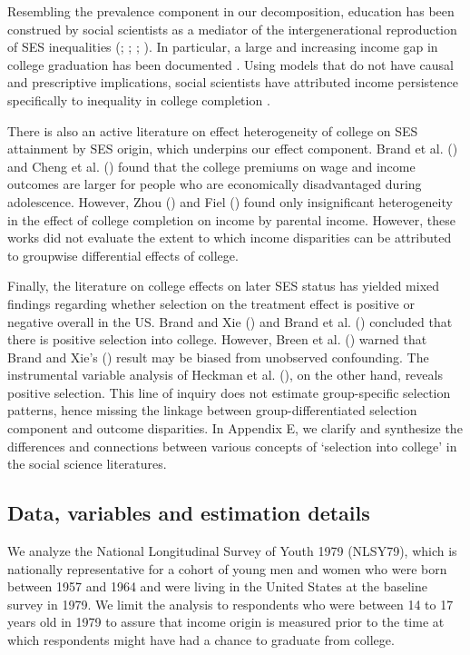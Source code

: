 \documentclass[12pt,a4paper]{article}
\begin{document}
Resembling the prevalence component in our decomposition, education has been construed by social scientists as a mediator of the intergenerational reproduction of SES inequalities (\citealp[chapter 4 \& 5]{blau_american_1978}; \citealp[p.255-9]{featherman_opportunity_1978}; \citealp{ishida_class_1995}; \citealp{breen_educational_2010}). In particular, a large and increasing income gap in college graduation has been documented \citep{ziol-guest_parent_2016, bailey_gains_2011}. Using models that do not have causal and prescriptive implications, social scientists have attributed income persistence specifically to inequality in college completion \citep{bloome_educational_2018}. 

There is also an active literature on effect heterogeneity of college on SES attainment by SES origin, which underpins our effect component. Brand et al. (\citeyear{brand_uncovering_2021}) and Cheng et al. (\citeyear{cheng_heterogeneous_2021}) found that the college premiums on wage and income outcomes are larger for people who are economically disadvantaged during adolescence. However, Zhou (\citeyear{zhou_equalization_2019}) and Fiel (\citeyear{fiel_great_2020}) found only insignificant heterogeneity in the effect of college completion on income by parental income. However, these works did not evaluate the extent to which income disparities can be attributed to groupwise differential effects of college.

Finally, the literature on college effects on later SES status has yielded mixed findings regarding whether selection on the treatment effect is positive or negative overall in the US. Brand and Xie (\citeyear{brand_who_2010}) and Brand et al. (\citeyear{brand_uncovering_2021}) concluded that there is positive selection into college. However, Breen et al. (\citeyear{breen_heterogeneous_2015}) warned that Brand and Xie's (\citeyear{brand_who_2010}) result may be biased from unobserved confounding. The instrumental variable analysis of Heckman et al. (\citeyear{heckman_returns_2018}), on the other hand, reveals positive selection. This line of inquiry does not estimate group-specific selection patterns, hence missing the linkage between group-differentiated selection component and outcome disparities. In Appendix E, we clarify and synthesize the differences and connections between various concepts of `selection into college' in the social science literatures. 

\subsection{Data, variables and estimation details}
We analyze the National Longitudinal Survey of Youth 1979 (NLSY79), which is nationally representative for a cohort of young men and women who were born between 1957 and 1964 and were living in the United States at the baseline survey in 1979.
We  limit the analysis to respondents who were between 14 to 17 years old in 1979 to assure that income origin is measured prior to the time at which respondents might have had a chance to graduate from college. 
\end{document}
